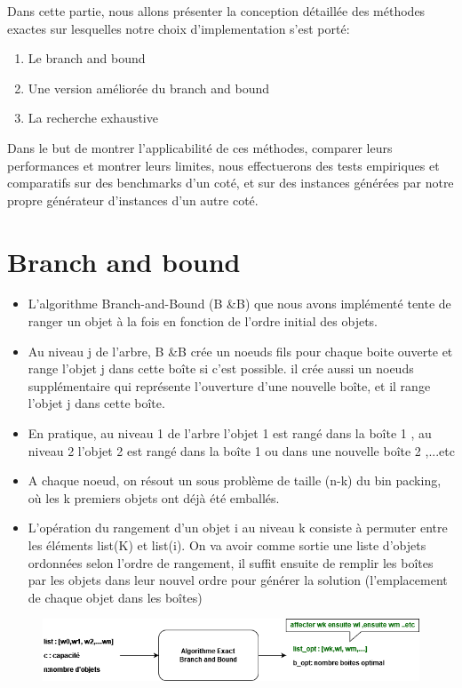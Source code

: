 \documentclass[12pt]{article}
\begin{document}
Dans cette partie, nous allons présenter la conception détaillée des méthodes exactes sur lesquelles notre choix d'implementation s'est porté:

\begin{enumerate}

\item Le branch and bound

\item Une version améliorée du branch and bound

\item La recherche exhaustive
\end{enumerate}
Dans le but de montrer l’applicabilité de ces méthodes, comparer leurs performances et montrer leurs limites, nous effectuerons des tests empiriques et comparatifs sur des benchmarks d’un coté, et sur des instances générées par notre propre générateur d’instances d’un autre coté.
\setcounter{section}{0}
\section{Branch and bound}
\begin{itemize}
    \item L'algorithme Branch-and-Bound (B \&B) que nous avons implémenté tente de ranger un objet à la fois en fonction de l’ordre initial des objets. 
    \item Au niveau j de l’arbre, B \&B crée un noeuds fils pour chaque boite ouverte et range l’objet j dans cette boîte si c’est possible. il crée aussi un noeuds supplémentaire qui représente l’ouverture d’une nouvelle boîte, et il range l’objet j dans cette boîte.
    \item En pratique, au niveau 1 de l’arbre l’objet 1 est rangé dans la boîte 1 , au niveau 2 l’objet 2 est rangé dans la boîte 1 ou dans une nouvelle boîte 2 ,...etc 
    \item A chaque noeud, on résout un sous problème de taille (n-k) du bin packing, où les k premiers objets ont déjà été emballés.
    \item L’opération du rangement d’un objet i au niveau k consiste à permuter entre les éléments list(K) et list(i). On va avoir comme sortie une liste d’objets ordonnées selon l’ordre de rangement, il suffit ensuite de remplir les boîtes par les objets dans leur nouvel ordre pour générer la solution (l’emplacement de chaque objet dans les boîtes) 
\end{itemize}

\begin{figure}[h]
    \includegraphics[width=\linewidth]{../figures/diagr1.png}
\end{figure}
\end{document}
